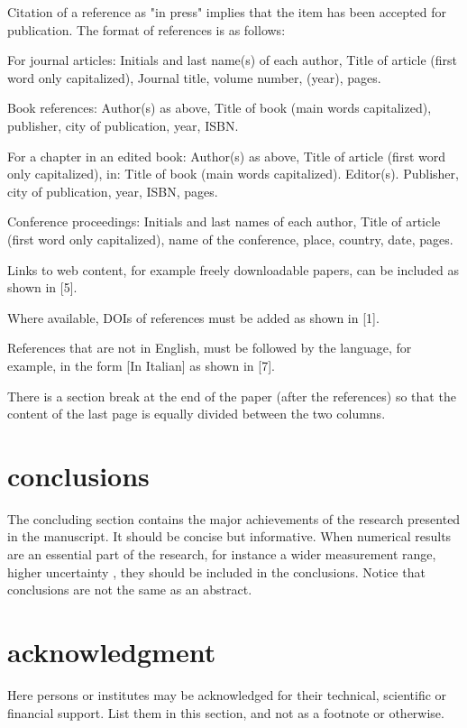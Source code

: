\documentclass[10pt]{imeko_acta}
\begin{document}
Citation of a reference as "in press" implies that the item has been accepted for publication.
The format of references is as follows:

\begin{enumerate-a}
	\item For journal articles: Initials and last name(s) of each author, Title of article (first word only capitalized), Journal title, volume number, (year), pages.
	\item Book references: Author(s) as above, Title of book (main words capitalized), publisher, city of publication, year, ISBN. 
	\item For a chapter in an edited book: Author(s) as above, Title of article (first word only capitalized), in: Title of book (main words capitalized). Editor(s). Publisher, city of publication, year, ISBN, pages.
	\item Conference proceedings: Initials and last names of each author, Title of article (first word only capitalized), name of the conference, place, country, date, pages.
	\item Links to web content, for example freely downloadable papers, can be included as shown in [5].
	\item Where available, DOIs of references must be added as shown in [1].
	\item References that are not in English, must be followed by the language, for example, in the form [In Italian] as shown in [7].
\end{enumerate-a}

There is a section break at the end of the paper (after the references) so that the content of the last page is equally divided between the two columns.


\section{conclusions}
The concluding section contains the major achievements of the research presented in the manuscript. It should be concise but informative. When numerical results are an essential part of the research, for instance a wider measurement range, higher uncertainty \cite{Pop2006}, they should be included in the conclusions.
Notice that conclusions are not the same as an abstract. 

\section*{acknowledgment} 

Here persons or institutes may be acknowledged for their technical, scientific or financial support. List them in this section, and not as a footnote or otherwise. 



\end{document}

